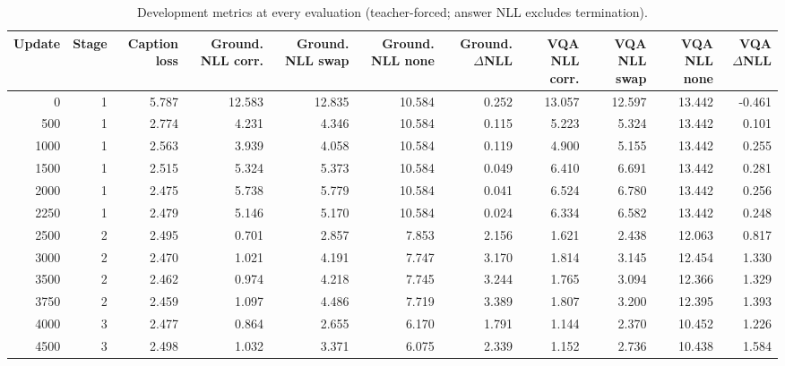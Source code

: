 \begin{table}[t]
\centering
\small
\caption{Development metrics at every evaluation (teacher-forced; answer NLL excludes termination).}
\label{tab:t2-dev}
\begin{tabular}{rrrrrrrrrrr}
\toprule
Update & Stage & Caption loss & Ground. NLL corr. & Ground. NLL swap & Ground. NLL none & Ground. $\Delta$NLL & VQA NLL corr. & VQA NLL swap & VQA NLL none & VQA $\Delta$NLL \\
\midrule
0 & 1 & 5.787 & 12.583 & 12.835 & 10.584 & 0.252 & 13.057 & 12.597 & 13.442 & -0.461 \\
500 & 1 & 2.774 & 4.231 & 4.346 & 10.584 & 0.115 & 5.223 & 5.324 & 13.442 & 0.101 \\
1000 & 1 & 2.563 & 3.939 & 4.058 & 10.584 & 0.119 & 4.900 & 5.155 & 13.442 & 0.255 \\
1500 & 1 & 2.515 & 5.324 & 5.373 & 10.584 & 0.049 & 6.410 & 6.691 & 13.442 & 0.281 \\
2000 & 1 & 2.475 & 5.738 & 5.779 & 10.584 & 0.041 & 6.524 & 6.780 & 13.442 & 0.256 \\
2250 & 1 & 2.479 & 5.146 & 5.170 & 10.584 & 0.024 & 6.334 & 6.582 & 13.442 & 0.248 \\
2500 & 2 & 2.495 & 0.701 & 2.857 & 7.853 & 2.156 & 1.621 & 2.438 & 12.063 & 0.817 \\
3000 & 2 & 2.470 & 1.021 & 4.191 & 7.747 & 3.170 & 1.814 & 3.145 & 12.454 & 1.330 \\
3500 & 2 & 2.462 & 0.974 & 4.218 & 7.745 & 3.244 & 1.765 & 3.094 & 12.366 & 1.329 \\
3750 & 2 & 2.459 & 1.097 & 4.486 & 7.719 & 3.389 & 1.807 & 3.200 & 12.395 & 1.393 \\
4000 & 3 & 2.477 & 0.864 & 2.655 & 6.170 & 1.791 & 1.144 & 2.370 & 10.452 & 1.226 \\
4500 & 3 & 2.498 & 1.032 & 3.371 & 6.075 & 2.339 & 1.152 & 2.736 & 10.438 & 1.584 \\
\bottomrule
\end{tabular}
\end{table}
